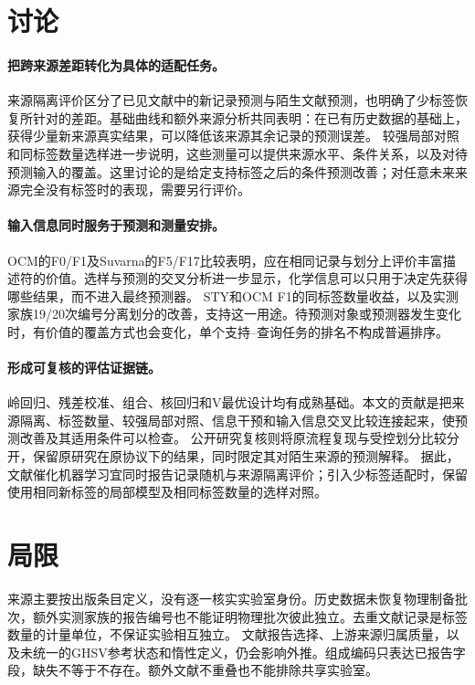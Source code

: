 \documentclass[11pt,a4paper]{article}
\begin{document}
\section{讨论}
\paragraph{把跨来源差距转化为具体的适配任务。}
来源隔离评价区分了已见文献中的新记录预测与陌生文献预测，也明确了少标签恢复所针对的差距。基础曲线和额外来源分析共同表明：在已有历史数据的基础上，获得少量新来源真实结果，可以降低该来源其余记录的预测误差。
较强局部对照和同标签数量选样进一步说明，这些测量可以提供来源水平、条件关系，以及对待预测输入的覆盖。这里讨论的是给定支持标签之后的条件预测改善；对任意未来来源完全没有标签时的表现，需要另行评价。

\paragraph{输入信息同时服务于预测和测量安排。}
OCM的F0/F1及Suvarna的F5/F17比较表明，应在相同记录与划分上评价丰富描述符的价值。选样与预测的交叉分析进一步显示，化学信息可以只用于决定先获得哪些结果，而不进入最终预测器。
STY和OCM F1的同标签数量收益，以及实测家族19/20次编号分离划分的改善，支持这一用途。待预测对象或预测器发生变化时，有价值的覆盖方式也会变化，单个支持--查询任务的排名不构成普遍排序。

\paragraph{形成可复核的评估证据链。}
岭回归、残差校准、组合、核回归和V最优设计均有成熟基础。本文的贡献是把来源隔离、标签数量、较强局部对照、信息干预和输入信息交叉比较连接起来，使预测改善及其适用条件可以检查。
公开研究复核则将原流程复现与受控划分比较分开，保留原研究在原协议下的结果，同时限定其对陌生来源的预测解释。
据此，文献催化机器学习宜同时报告记录随机与来源隔离评价；引入少标签适配时，保留使用相同新标签的局部模型及相同标签数量的选样对照。

\section{局限}
来源主要按出版条目定义，没有逐一核实实验室身份。历史数据未恢复物理制备批次，额外实测家族的报告编号也不能证明物理批次彼此独立。去重文献记录是标签数量的计量单位，不保证实验相互独立。
文献报告选择、上游来源归属质量，以及未统一的GHSV参考状态和惰性定义，仍会影响外推。组成编码只表达已报告字段，缺失不等于不存在。额外文献不重叠也不能排除共享实验室。
\end{document}
